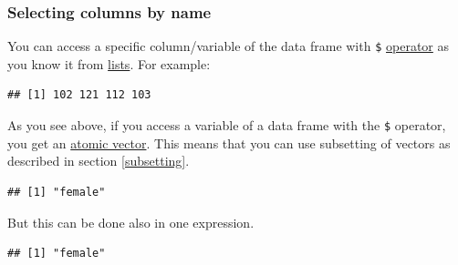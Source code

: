 \documentclass[
]{scrartcl}
\newenvironment{Shaded}{\begin{snugshade}}{\end{snugshade}}
\newcommand{\CommentTok}[1]{\textcolor[rgb]{0.56,0.35,0.01}{\textit{#1}}}
\newcommand{\DecValTok}[1]{\textcolor[rgb]{0.00,0.00,0.81}{#1}}
\newcommand{\NormalTok}[1]{#1}
\newcommand{\OtherTok}[1]{\textcolor[rgb]{0.56,0.35,0.01}{#1}}
\newcommand{\SpecialCharTok}[1]{\textcolor[rgb]{0.81,0.36,0.00}{\textbf{#1}}}
\begin{document}
\hypertarget{selectbyname}{%
\subsubsection{Selecting columns by name}\label{selectbyname}}

You can access a specific column/variable of the data frame with \texttt{\$} \protect\hyperlink{listsdollar}{operator} as you know it from \protect\hyperlink{lists}{lists}. For example:

\begin{Shaded}
\end{Shaded}

\begin{verbatim}
## [1] 102 121 112 103
\end{verbatim}

As you see above, if you access a variable of a data frame with the \texttt{\$} operator, you get an \protect\hyperlink{vectors}{atomic vector}. This means that you can use subsetting of vectors as described in section \ref{subsetting}.

\begin{Shaded}
\end{Shaded}

\begin{verbatim}
## [1] "female"
\end{verbatim}

But this can be done also in one expression.

\begin{Shaded}
\end{Shaded}

\begin{verbatim}
## [1] "female"
\end{verbatim}
\end{document}
